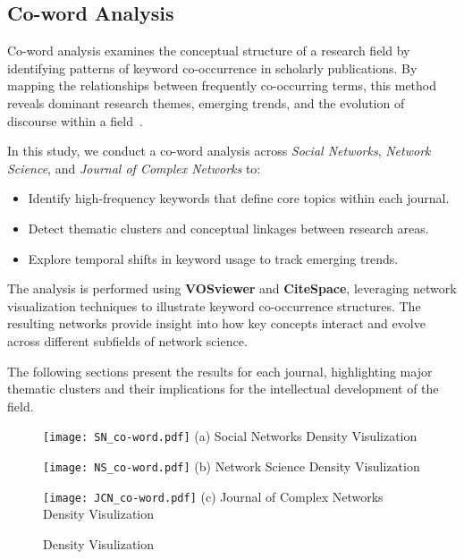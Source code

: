 \documentclass[twocolumn]{article}
\begin{document}
		\subsection{Co-word Analysis}
		
		Co-word analysis examines the conceptual structure of a research field by identifying patterns of keyword co-occurrence in scholarly publications. By mapping the relationships between frequently co-occurring terms, this method reveals dominant research themes, emerging trends, and the evolution of discourse within a field~\cite{callon1983co, coulter1998co, ding2001co}.
		
		
		In this study, we conduct a co-word analysis across \textit{Social Networks}, \textit{Network Science}, and \textit{Journal of Complex Networks} to:
		
		\begin{itemize}
			\item Identify high-frequency keywords that define core topics within each journal.
			\item Detect thematic clusters and conceptual linkages between research areas.
			\item Explore temporal shifts in keyword usage to track emerging trends.
		\end{itemize}
		
		The analysis is performed using \textbf{VOSviewer} and \textbf{CiteSpace}, leveraging network visualization techniques to illustrate keyword co-occurrence structures. The resulting networks provide insight into how key concepts interact and evolve across different subfields of network science.
		
		The following sections present the results for each journal, highlighting major thematic clusters and their implications for the intellectual development of the field.
		
		\begin{figure*}
			\centering
			\caption{\label{fig.fig11}Density Visulization}
			\begin{minipage}[b]{0.32\textwidth}
				\centering
				\texttt{[image: SN\_co-word.pdf]}
				(a) Social Networks Density Visulization
			\end{minipage}
			\begin{minipage}[b]{0.32\textwidth}
				\centering
				\texttt{[image: NS\_co-word.pdf]}
				(b) Network Science Density Visulization
			\end{minipage}
			\begin{minipage}[b]{0.32\textwidth}
				\centering
				\texttt{[image: JCN\_co-word.pdf]}
				(c) Journal of Complex Networks Density Visulization
			\end{minipage}
		\end{figure*}
		
\end{document}
